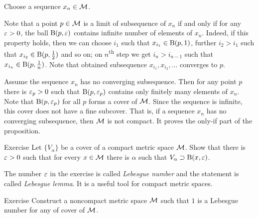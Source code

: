 Choose a sequence $x_n\in \mathcal{M}$.

Note that a point $p\in \mathcal{M}$ is a limit of subsequence of $x_n$ if and only if for any $\varepsilon>0$, the ball $\mathrm{B}(p,\varepsilon)$ contains infinite number of elements of $x_n$.
Indeed, if this property holds, then we can choose $i_1$ such that $x_{i_1}\in \mathrm{B}(p,1)$, further $i_2>i_1$ such that $x_{i_2}\in \mathrm{B}(p,\tfrac12)$ and so on; on $n$\textsuperscript{th} step we get $i_n>i_{n-1}$ such that $x_{i_n}\in \mathrm{B}(p,\tfrac1n)$.
Note that obtained subsequence $x_{i_1},x_{i_2},\dots$ converges to $p$.

Assume the sequence $x_n$ has no converging subsequence.
Then for any point $p$ there is $\varepsilon_p>0$ such that $\mathrm{B}(p,\varepsilon_p)$ contains only finitely many elements of $x_n$.
Note that $\mathrm{B}(p,\varepsilon_p)$ for all $p$ forms a cover of $\mathcal{M}$.
Since the sequence is infinite, this cover does not have a fine subcover.
That is, if a sequence $x_n$ has no converging subsequence, then $\mathcal{M}$ is not compact.
It proves the only-if part of the proposition.
\qeds


\begin{thm}{Exercise}
Let $\{V_\alpha\}$ be a cover of a compact metric space $\mathcal{M}$.
Show that there is $\varepsilon > 0$ such that for every $x\in\mathcal{M}$ there is $\alpha$ such that $V_\alpha\supset \mathrm{B}(x,\varepsilon)$.

\end{thm}


The number $\varepsilon$ in the exercise is called \emph{Lebesgue number} and the statement is called \emph{Lebesgue lemma}.
It is a useful tool for compact metric spaces.

\begin{thm}{Exercise}
Construct a noncompact metric space $\mathcal{M}$ such that $1$ is a Lebesgue number for any of cover of $\mathcal{M}$. 
\end{thm}

